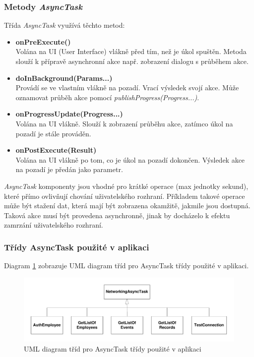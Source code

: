 \documentclass{diplomka}
\begin{document}
\subsubsection*{Metody \emph{AsyncTask}}
Třída \emph{AsyncTask} využívá těchto metod:
\begin{itemize}[]
\item \textbf{onPreExecute()}\\
Volána na UI (User Interface) vlákně před tím, než je úkol spuštěn. Metoda slouží k přípravě asynchronní akce např. zobrazení dialogu s průběhem akce.
\item \textbf{doInBackground(Params...)}\\
Provádí se ve vlastním vlákně na pozadí. Vrací výsledek svojí akce. Může oznamovat průběh akce pomocí \emph{ publishProgress(Progress...)}.
\item \textbf{onProgressUpdate(Progress...)}\\
Volána na UI vlákně. Slouží k zobrazení průběhu akce, zatímco úkol na pozadí je stále prováděn.
\item \textbf{onPostExecute(Result)}\\
Volána na UI vlákně po tom, co je úkol na pozadí dokončen. Výsledek akce na pozadí je předán jako parametr.
\end{itemize}

\emph{AsyncTask} komponenty jsou vhodné pro krátké operace (max jednotky sekund), které přímo ovlivňují chování uživatelského rozhraní. Příkladem takové operace může být stažení dat, která mají být zobrazena okamžitě, jakmile jsou dostupná. Taková akce musí být provedena asynchronně, jinak by docházelo k efektu zamrzání uživatelského rozhraní.

\subsubsection*{Třídy AsyncTask použité v aplikaci}

Diagram \ref{fig:async} zobrazuje UML diagram tříd pro AsyncTask třídy použité v aplikaci.
\begin{figure}[H]
  \centering
  \includegraphics[scale=0.7]{visio/async.pdf}
\caption{UML diagram tříd pro AsyncTask třídy použité v aplikaci}
\label{fig:async}
\end{figure}
\end{document}
